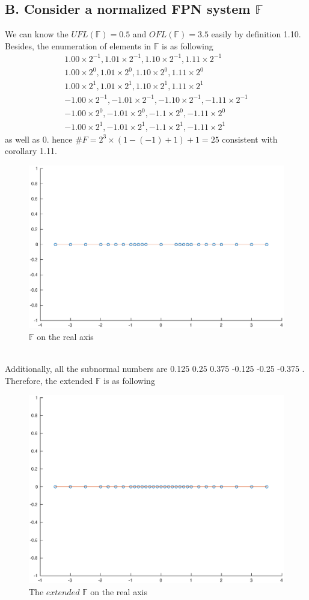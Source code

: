 \documentclass[twoside,a4paper]{article}
\begin{document}
\subsection*{B. Consider a normalized FPN system $\mathbb{F}$}
We can know the $UFL(\mathbb{F})=0.5$ and $OFL(\mathbb{F})=3.5$ easily by definition 1.10. Besides, the enumeration of elements in $\mathbb{F}$ is as following
\begin{gather}
1.00\times2^{-1} , 1.01\times2^{-1} , 1.10\times2^{-1} , 1.11\times2^{-1} \\
1.00\times2^{0} , 1.01\times2^{0} , 1.10\times2^{0} , 1.11\times2^{0} \\
1.00\times2^{1} , 1.01\times2^{1} , 1.10\times2^{1} , 1.11\times2^{1} \\
-1.00\times2^{-1} , -1.01\times2^{-1} , -1.10\times2^{-1} , -1.11\times2^{-1} \\ 
-1.00\times2^{0} , -1.01\times2^{0} , -1.1\times2^{0} , -1.11\times2^{0} \\
-1.00\times2^{1} , -1.01\times2^{1} , -1.1\times2^{1} , -1.11\times2^{1}
\end{gather}
as well as $0$. hence $\#F=2^3\times(1-(-1)+1)+1=25$ consistent with corollary 1.11.
\begin{figure}[h]
\includegraphics[width=8in]{Figure/NumDis1.eps}
\caption{$\mathbb{F}$ on the real axis}
\end{figure}
\\
Additionally, all the subnormal numbers are 0.125 0.25 0.375 -0.125 -0.25 -0.375 . Therefore, the extended $\mathbb{F}$  is as following
\begin{figure}[h]
\includegraphics[width=8in]{Figure/NumDis2.eps}
\caption{The $extended$ $\mathbb{F}$ on the real axis}
\end{figure}
\end{document}
